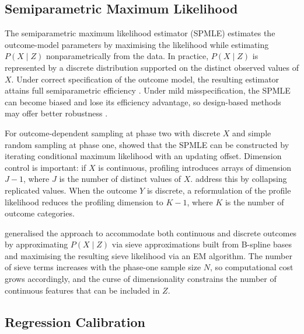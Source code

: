 \subsection{Semiparametric Maximum Likelihood}
\label{sec:spmle}

The semiparametric maximum likelihood estimator (SPMLE) estimates the outcome-model parameters by maximising the likelihood while estimating $P(X \mid Z)$ nonparametrically from the data. In practice, $P(X \mid Z)$ is represented by a discrete distribution supported on the distinct observed values of $X$. Under correct specification of the outcome model, the resulting estimator attains full semiparametric efficiency \citep{breslow1997maximum, scott1997fitting}. Under mild misspecification, the SPMLE can become biased and lose its efficiency advantage, so design-based methods may offer better robustness \citep{han2021combining}.

For outcome-dependent sampling at phase two with discrete $X$ and simple random sampling at phase one, \citet{scott1997fitting} showed that the SPMLE can be constructed by iterating conditional maximum likelihood with an updating offset. Dimension control is important: if $X$ is continuous, profiling introduces arrays of dimension $J - 1$, where $J$ is the number of distinct values of $X$. \citet{ScottWild2006-efficient-spmle} address this by collapsing replicated values. When the outcome $Y$ is discrete, a reformulation of the profile likelihood reduces the profiling dimension to $K - 1$, where $K$ is the number of outcome categories.

\citet{tao2017efficient} generalised the approach to accommodate both continuous and discrete outcomes by approximating $P(X \mid Z)$ via sieve approximations \citep{Grenander1981-AbstractInference} built from B-spline bases \citep{Schumaker1981-SplineFunctions} and maximising the resulting sieve likelihood via an EM algorithm. The number of sieve terms increases with the phase-one sample size $N$, so computational cost grows accordingly, and the curse of dimensionality constrains the number of continuous features that can be included in $Z$.

\subsection{Regression Calibration}
\label{sec:regcal}


